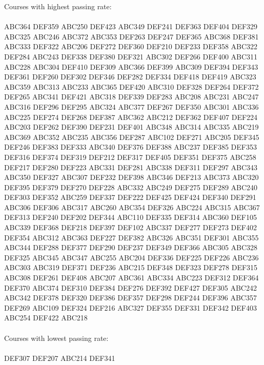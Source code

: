 Courses with highest passing rate: \\ \\
ABC364	DEF359	ABC250	DEF423	ABC349	DEF241	DEF363	DEF404	DEF329	ABC325	
ABC246	ABC372	ABC353	DEF263	DEF247	DEF365	ABC368	DEF381	ABC333	DEF322	
ABC206	DEF272	DEF360	DEF210	DEF233	DEF358	ABC322	DEF284	ABC243	DEF338
DEF380	DEF321	ABC302	DEF266	DEF400	ABC311	ABC228	ABC304	DEF410
DEF309
ABC366
DEF399
ABC309
DEF394
DEF343
DEF361
DEF260
DEF302
DEF346
DEF282
DEF334
DEF418
DEF419
ABC323
ABC359
ABC313
ABC233
ABC365
DEF420
ABC310
DEF328
DEF264
DEF372
DEF265
ABC341
DEF421
ABC318
DEF339
DEF283
ABC208
ABC231
ABC247
ABC316
DEF296
DEF295
ABC324
ABC377
DEF267
DEF350
ABC301
ABC336
ABC225
DEF274
DEF268
DEF387
ABC362
ABC212
DEF362
DEF407
DEF224
ABC203
DEF262
DEF390
DEF231
DEF401
ABC348
ABC314
ABC335
ABC219
ABC369
ABC352
ABC235
ABC356
DEF287
ABC102
DEF271
ABC205
DEF345
DEF246
DEF383
DEF333
ABC340
DEF376
DEF388
ABC237
DEF385
DEF353
DEF316
DEF374
DEF319
DEF212
DEF317
DEF405
DEF351
DEF375
ABC258
DEF217
DEF280
DEF223
ABC331
DEF281
ABC338
DEF311
DEF297
ABC343
ABC350
DEF327
ABC307
DEF232
DEF398
ABC346
DEF213
ABC373
ABC320
DEF395
DEF379
DEF270
DEF228
ABC332
ABC249
DEF275
DEF289
ABC240
DEF303
DEF352
ABC259
DEF337
DEF222
DEF425
DEF424
DEF340
DEF291
ABC306
DEF306
ABC317
ABC260
ABC354
DEF326
ABC224
ABC315
ABC367
DEF313
DEF240
DEF202
DEF344
ABC110
DEF335
DEF314
ABC360
DEF105
ABC339
DEF368
DEF218
DEF397
DEF102
ABC337
DEF277
DEF273
DEF402
DEF354
ABC312
ABC363
DEF227
DEF382
ABC326
ABC351
DEF301
ABC355
ABC344
DEF288
DEF377
DEF290
DEF237
DEF349
DEF366
ABC305
ABC328
DEF325
ABC345
ABC347
ABC255
ABC204
DEF336
DEF225
DEF226
ABC236
ABC303
ABC319
DEF371
DEF236
ABC215
DEF348
DEF323
DEF278
DEF315
ABC308
DEF261
DEF408
ABC207
ABC361
ABC334
ABC223
DEF312
DEF364
DEF370
ABC374
DEF310
DEF384
DEF276
DEF392
DEF427
DEF305
ABC242
ABC342
DEF378
DEF320
DEF386
DEF357
DEF298
DEF244
DEF396
ABC357
DEF269
ABC109
DEF324
DEF216
ABC327
DEF355
DEF331
DEF342
DEF403
ABC254
DEF422
ABC218\\ \\
Courses with lowest passing rate: \\ \\
DEF307
DEF207
ABC214
DEF341

